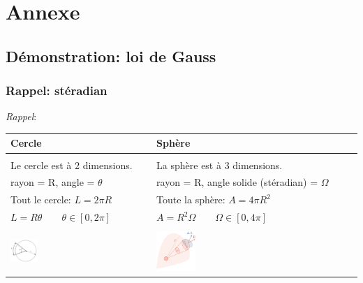 \documentclass[a4paper]{article}
\begin{document}
\section{Annexe}











\subsection{Démonstration: loi de Gauss}









\subsubsection{Rappel: stéradian}

\emph{Rappel}: 
\begin{center}
\begin{tabular}{p{7cm}|p{7cm}}
Cercle & Sphère \\
\hline
 & \\
Le cercle est à 2 dimensions. & La sphère est à 3 dimensions. \\
rayon = R, angle = $ \theta $ & rayon = R, angle solide (stéradian) = $ \Omega $ \\
Tout le cercle: $ L = 2 \pi R $ & Toute la sphère: $ A = 4 \pi R^2 $ \\
$ L = R \theta \qquad \theta \in [0, 2 \pi] $ & $ A = R^2 \Omega \qquad \Omega \in [0, 4 \pi] $ \\
 & \\
\centering \includegraphics[width=0.20\textwidth]{cercle.png} & \centering \includegraphics[width=0.20\textwidth]{steradian.PNG}
\end{tabular}
\end{center}
\end{document}
